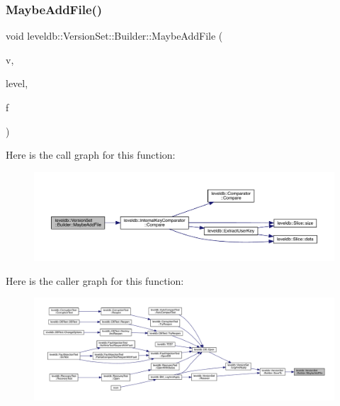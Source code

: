 \subsubsection{\texorpdfstring{MaybeAddFile()}{MaybeAddFile()}}
{\footnotesize\ttfamily void leveldb\+::\+Version\+Set\+::\+Builder\+::\+Maybe\+Add\+File (\begin{DoxyParamCaption}\item[{\mbox{\hyperlink{classleveldb_1_1_version}{Version}} $\ast$}]{v,  }\item[{int}]{level,  }\item[{\mbox{\hyperlink{structleveldb_1_1_file_meta_data}{File\+Meta\+Data}} $\ast$}]{f }\end{DoxyParamCaption})\hspace{0.3cm}{\ttfamily [inline]}}

Here is the call graph for this function\+:
\nopagebreak
\begin{figure}[H]
\begin{center}
\leavevmode
\includegraphics[width=350pt]{classleveldb_1_1_version_set_1_1_builder_aa90e0d9d0f8e05b8bcfa879d4f4a88c6_cgraph}
\end{center}
\end{figure}
Here is the caller graph for this function\+:
\nopagebreak
\begin{figure}[H]
\begin{center}
\leavevmode
\includegraphics[width=350pt]{classleveldb_1_1_version_set_1_1_builder_aa90e0d9d0f8e05b8bcfa879d4f4a88c6_icgraph}
\end{center}
\end{figure}
\mbox{\label{classleveldb_1_1_version_set_1_1_builder_a429b23cc022cac08ab2ba880ac5803d1}} 
